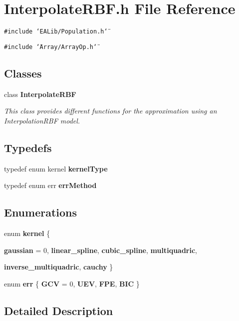 \section{Interpolate\-RBF.h File Reference}
\label{InterpolateRBF_8h}
{\tt \#include \char`\"{}EALib/Population.h\char`\"{}}\par
{\tt \#include \char`\"{}Array/Array\-Op.h\char`\"{}}\par
\subsection*{Classes}
\begin{CompactItemize}
\item 
class {\bf Interpolate\-RBF}
\begin{CompactList}\small\item\em This class provides different functions for the approximation using an Interpolation\-RBF model. \item\end{CompactList}\end{CompactItemize}
\subsection*{Typedefs}
\begin{CompactItemize}
\item 
typedef enum kernel {\bf kernel\-Type}\label{InterpolateRBF_8h_a0}

\item 
typedef enum err {\bf err\-Method}\label{InterpolateRBF_8h_a1}

\end{CompactItemize}
\subsection*{Enumerations}
\begin{CompactItemize}
\item 
enum {\bf kernel} \{ \par
{\bf gaussian} =  0, 
{\bf linear\_\-spline}, 
{\bf cubic\_\-spline}, 
{\bf multiquadric}, 
\par
{\bf inverse\_\-multiquadric}, 
{\bf cauchy}
 \}
\item 
enum {\bf err} \{ {\bf GCV} =  0, 
{\bf UEV}, 
{\bf FPE}, 
{\bf BIC}
 \}
\end{CompactItemize}


\subsection{Detailed Description}
